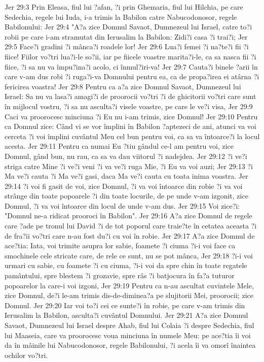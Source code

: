 Jer 29:3  Prin Eleasa, fiul lui ?afan, ?i prin Ghemaria, fiul lui Hilchia, pe care Sedechia, regele lui Iuda, i-a trimis la Babilon catre Nabucodonosor, regele Babilonului:
Jer 29:4  "A?a zice Domnul Savaot, Dumnezeul lui Israel, catre to?i robii pe care i-am stramutat din Ierusalim la Babilon: Zidi?i casa ?i trai?i;
Jer 29:5  Face?i gradini ?i mânca?i roadele lor!
Jer 29:6  Lua?i femei ?i na?te?i fii ?i fiice! Fiilor vo?tri lua?i-le so?ii, iar pe fiicele voastre marita?i-le, ca sa nasca fii ?i fiice, ?i sa nu va împu?ina?i acolo, ci înmul?iri-va!
Jer 29:7  Cauta?i binele ?arii în care v-am dus robi ?i ruga?i-va Domnului pentru ea, ca de propa?irea ei atârna ?i fericirea voastra!
Jer 29:8  Pentru ca a?a zice Domnul Savaot, Dumnezeul lui Israel: Sa nu va lasa?i amagi?i de proorocii vo?tri ?i de ghicitorii vo?tri care sunt în mijlocul vostru, ?i sa nu asculta?i visele voastre, pe care le ve?i visa,
Jer 29:9  Caci va proorocesc minciuna ?i Eu nu i-am trimis, zice Domnul!
Jer 29:10  Pentru ca Domnul zice: Când vi se vor împlini în Babilon ?aptezeci de ani, atunci va voi cerceta ?i voi împlini cuvântul Meu cel bun pentru voi, ca sa va întoarce?i la locul acesta.
Jer 29:11  Pentru ca numai Eu ?tiu gândul ce-l am pentru voi, zice Domnul, gând bun, nu rau, ca sa va dau viitorul ?i nadejdea.
Jer 29:12  ?i ve?i striga catre Mine ?i ve?i veni ?i va ve?i ruga Mie, ?i Eu va voi auzi;
Jer 29:13  ?i Ma ve?i cauta ?i Ma ve?i gasi, daca Ma ve?i cauta cu toata inima voastra.
Jer 29:14  ?i voi fi gasit de voi, zice Domnul, ?i va voi întoarce din robie ?i va voi strânge din toate popoarele ?i din toate locurile, de pe unde v-am izgonit, zice Domnul, ?i va voi întoarce din locul de unde v-am dus.
Jer 29:15  Voi zice?i: "Domnul ne-a ridicat prooroci în Babilon".
Jer 29:16  A?a zice Domnul de regele care ?ade pe tronul lui David ?i de tot poporul care traie?te în cetatea aceasta ?i de fra?ii vo?tri care n-au fost du?i cu voi în robie.
Jer 29:17  A?a zice Domnul de ace?tia: Iata, voi trimite asupra lor sabie, foamete ?i ciuma ?i-i voi face ca smochinele cele stricate care, de rele ce sunt, nu se pot mânca,
Jer 29:18  ?i-i voi urmari cu sabie, cu foamete ?i cu ciuma, ?i-i voi da spre chin în toate regatele pamântului, spre blestem ?i grozavie, spre râs ?i batjocura în fa?a tuturor popoarelor la care-i voi izgoni,
Jer 29:19  Pentru ca n-au ascultat cuvintele Mele, zice Domnul, de?i le-am trimis dis-de-diminea?a pe slujitorii Mei, proorocii; zice Domnul.
Jer 29:20  Iar voi to?i cei ce sunte?i în robie, pe care v-am trimis din Ierusalim la Babilon, asculta?i cuvântul Domnului.
Jer 29:21  A?a zice Domnul Savaot, Dumnezeul lui Israel despre Ahab, fiul lui Colaia ?i despre Sedechia, fiul lui Maaseia, care va proorocesc voua minciuna în numele Meu: pe ace?tia îi voi da în mâinile lui Nabucodonosor, regele Babilonului, ?i acela îi va omorî înaintea ochilor vo?tri.
